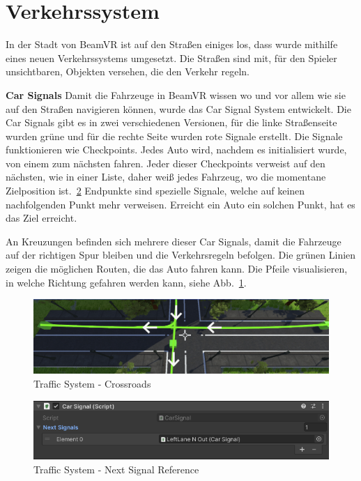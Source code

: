 \section{Verkehrssystem}
\label{sec:traffic-system}
In der Stadt von BeamVR ist auf den Straßen einiges los, dass wurde mithilfe eines neuen Verkehrssystems umgesetzt.
Die Straßen sind mit, f\"ur den Spieler unsichtbaren, Objekten versehen, die den Verkehr regeln.

\textbf{Car Signals}
Damit die Fahrzeuge in BeamVR wissen wo und vor allem wie sie auf den Straßen navigieren k\"onnen, wurde das Car Signal System entwickelt.
Die Car Signals gibt es in zwei verschiedenen Versionen, f\"ur die linke Straßenseite wurden gr\"une und f\"ur die rechte Seite wurden rote Signale erstellt.
Die Signale funktionieren wie Checkpoints.
Jedes Auto wird, nachdem es initialisiert wurde, von einem zum n\"achsten fahren.
Jeder dieser Checkpoints verweist auf den nächsten, wie in einer Liste, daher weiß jedes Fahrzeug, wo die momentane Zielposition ist.~\ref{fig:trafficsystem_next_signal_reference}
Endpunkte sind spezielle Signale, welche auf keinen nachfolgenden Punkt mehr verweisen.
Erreicht ein Auto ein solchen Punkt, hat es das Ziel erreicht.

An Kreuzungen befinden sich mehrere dieser Car Signals, damit die Fahrzeuge auf der richtigen Spur bleiben und die Verkehrsregeln befolgen.
Die gr\"unen Linien zeigen die m\"oglichen Routen, die das Auto fahren kann.
Die Pfeile visualisieren, in welche Richtung gefahren werden kann, siehe Abb.~\ref{fig:trafficsystem_crossroads}.


\begin{figure}
    \centering
    \includegraphics[scale=0.5]{pics/trafficsystem_carsignal_crossroads}
    \caption{Traffic System - Crossroads}
    \label{fig:trafficsystem_crossroads}
\end{figure}

\begin{figure}
    \centering
    \includegraphics[scale=0.7]{pics/trafficsystem_carsignal_signal_reference}
    \caption{Traffic System - Next Signal Reference}
    \label{fig:trafficsystem_next_signal_reference}
\end{figure}


